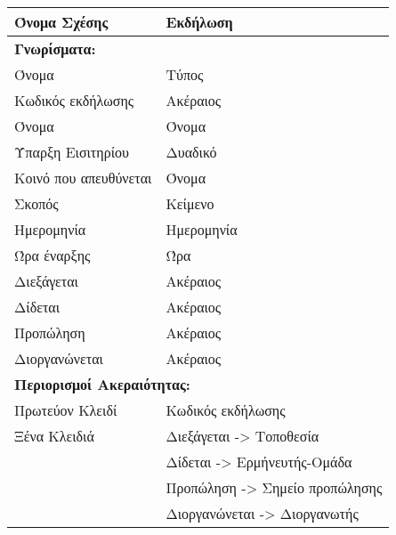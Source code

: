 \begin{tabular}{|p{6cm}|p{8cm}|}
  \hline
  Όνομα Σχέσης          & Εκδήλωση                         \\ \hline
  \multicolumn{2}{|l|}{\textbf{Γνωρίσματα:}}               \\ \hline
  Όνομα                 & Τύπος                            \\ \hline
  Κωδικός εκδήλωσης     & Ακέραιος                         \\ \hline
  Όνομα                 & Όνομα                            \\ \hline
  Ύπαρξη Εισιτηρίου     & Δυαδικό                          \\ \hline
  Κοινό που απευθύνεται & Όνομα                            \\ \hline
  Σκοπός                & Κείμενο                          \\ \hline
  Ημερομηνία            & Ημερομηνία                       \\ \hline
  Ώρα έναρξης           & Ώρα                              \\ \hline
  Διεξάγεται            & Ακέραιος                         \\ \hline
  Δίδεται               & Ακέραιος                         \\ \hline
  Προπώληση             & Ακέραιος                         \\ \hline
  Διοργανώνεται         & Ακέραιος                         \\ \hline
  \multicolumn{2}{|l|}{\textbf{Περιορισμοί Ακεραιότητας:}} \\ \hline
  Πρωτεύον Κλειδί       & Κωδικός εκδήλωσης                \\ \hline
  Ξένα Κλειδιά          & Διεξάγεται -> Τοποθεσία          \\ \cline{2-2}
                        & Δίδεται -> Ερμήνευτής-Ομάδα      \\ \cline{2-2}
                        & Προπώληση -> Σημείο προπώλησης   \\ \cline{2-2}
                        & Διοργανώνεται -> Διοργανωτής     \\ \hline
\end{tabular}

